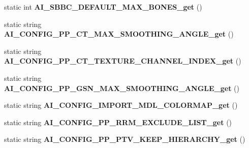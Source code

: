 \begin{DoxyCompactItemize}
\item 
\hypertarget{class_assimp_p_i_n_v_o_k_e_a3b2dea0d2cc8524a6fa2db5b237971d5}{static int {\bfseries A\+I\+\_\+\+S\+B\+B\+C\+\_\+\+D\+E\+F\+A\+U\+L\+T\+\_\+\+M\+A\+X\+\_\+\+B\+O\+N\+E\+S\+\_\+get} ()}\label{class_assimp_p_i_n_v_o_k_e_a3b2dea0d2cc8524a6fa2db5b237971d5}

\item 
\hypertarget{class_assimp_p_i_n_v_o_k_e_aa6f98331619f98c0017704af3b6af087}{static string {\bfseries A\+I\+\_\+\+C\+O\+N\+F\+I\+G\+\_\+\+P\+P\+\_\+\+C\+T\+\_\+\+M\+A\+X\+\_\+\+S\+M\+O\+O\+T\+H\+I\+N\+G\+\_\+\+A\+N\+G\+L\+E\+\_\+get} ()}\label{class_assimp_p_i_n_v_o_k_e_aa6f98331619f98c0017704af3b6af087}

\item 
\hypertarget{class_assimp_p_i_n_v_o_k_e_a34ccd34fbb71dcf573290c87d73278cc}{static string {\bfseries A\+I\+\_\+\+C\+O\+N\+F\+I\+G\+\_\+\+P\+P\+\_\+\+C\+T\+\_\+\+T\+E\+X\+T\+U\+R\+E\+\_\+\+C\+H\+A\+N\+N\+E\+L\+\_\+\+I\+N\+D\+E\+X\+\_\+get} ()}\label{class_assimp_p_i_n_v_o_k_e_a34ccd34fbb71dcf573290c87d73278cc}

\item 
\hypertarget{class_assimp_p_i_n_v_o_k_e_a576476a1cfdef6aaab5b42751963b5bf}{static string {\bfseries A\+I\+\_\+\+C\+O\+N\+F\+I\+G\+\_\+\+P\+P\+\_\+\+G\+S\+N\+\_\+\+M\+A\+X\+\_\+\+S\+M\+O\+O\+T\+H\+I\+N\+G\+\_\+\+A\+N\+G\+L\+E\+\_\+get} ()}\label{class_assimp_p_i_n_v_o_k_e_a576476a1cfdef6aaab5b42751963b5bf}

\item 
\hypertarget{class_assimp_p_i_n_v_o_k_e_ad7eb4919f67d674357327cc85ab6db0a}{static string {\bfseries A\+I\+\_\+\+C\+O\+N\+F\+I\+G\+\_\+\+I\+M\+P\+O\+R\+T\+\_\+\+M\+D\+L\+\_\+\+C\+O\+L\+O\+R\+M\+A\+P\+\_\+get} ()}\label{class_assimp_p_i_n_v_o_k_e_ad7eb4919f67d674357327cc85ab6db0a}

\item 
\hypertarget{class_assimp_p_i_n_v_o_k_e_a3dc3002dcf18ae912ff407b4c53f3b0d}{static string {\bfseries A\+I\+\_\+\+C\+O\+N\+F\+I\+G\+\_\+\+P\+P\+\_\+\+R\+R\+M\+\_\+\+E\+X\+C\+L\+U\+D\+E\+\_\+\+L\+I\+S\+T\+\_\+get} ()}\label{class_assimp_p_i_n_v_o_k_e_a3dc3002dcf18ae912ff407b4c53f3b0d}

\item 
\hypertarget{class_assimp_p_i_n_v_o_k_e_a0fea9b129e31232cd9ef4067fb2f7e47}{static string {\bfseries A\+I\+\_\+\+C\+O\+N\+F\+I\+G\+\_\+\+P\+P\+\_\+\+P\+T\+V\+\_\+\+K\+E\+E\+P\+\_\+\+H\+I\+E\+R\+A\+R\+C\+H\+Y\+\_\+get} ()}\label{class_assimp_p_i_n_v_o_k_e_a0fea9b129e31232cd9ef4067fb2f7e47}


\end{DoxyCompactItemize}
